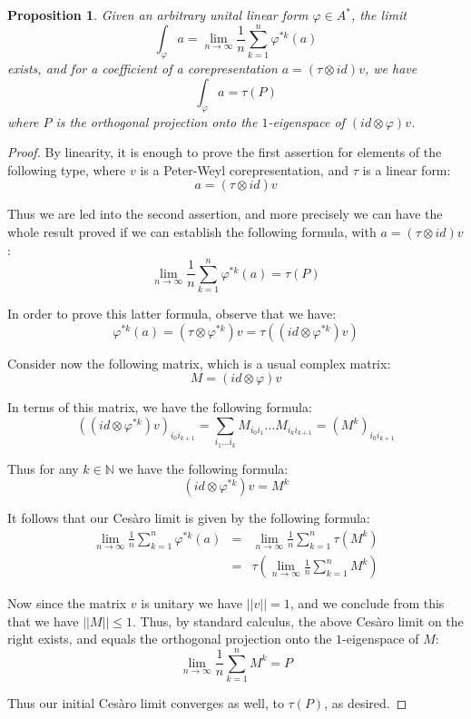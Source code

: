 \documentclass[12pt]{amsbook}
\newtheorem{proposition}[theorem]{Proposition}
\begin{document}

\begin{proposition}
Given an arbitrary unital linear form $\varphi\in A^*$, the limit
$$\int_\varphi a=\lim_{n\to\infty}\frac{1}{n}\sum_{k=1}^n\varphi^{*k}(a)$$
exists, and for a coefficient of a corepresentation $a=(\tau\otimes id)v$, we have
$$\int_\varphi a=\tau(P)$$
where $P$ is the orthogonal projection onto the $1$-eigenspace of $(id\otimes\varphi)v$.
\end{proposition}

\begin{proof}
By linearity, it is enough to prove the first assertion for elements of the following type, where $v$ is a Peter-Weyl corepresentation, and $\tau$ is a linear form:
$$a=(\tau\otimes id)v$$

Thus we are led into the second assertion, and more precisely we can have the whole result proved if we can establish the following formula, with $a=(\tau\otimes id)v$:
$$\lim_{n\to\infty}\frac{1}{n}\sum_{k=1}^n\varphi^{*k}(a)=\tau(P)$$

In order to prove this latter formula, observe that we have:
$$\varphi^{*k}(a)
=(\tau\otimes\varphi^{*k})v
=\tau((id\otimes\varphi^{*k})v)$$

Consider now the following matrix, which is a usual complex matrix:
$$M=(id\otimes\varphi)v$$

In terms of this matrix, we have the following formula:
$$((id\otimes\varphi^{*k})v)_{i_0i_{k+1}}
=\sum_{i_1\ldots i_k}M_{i_0i_1}\ldots M_{i_ki_{k+1}}
=(M^k)_{i_0i_{k+1}}$$

Thus for any $k\in\mathbb N$ we have the following formula:
$$(id\otimes\varphi^{*k})v=M^k$$

It follows that our Ces\`aro limit is given by the following formula:
\begin{eqnarray*}
\lim_{n\to\infty}\frac{1}{n}\sum_{k=1}^n\varphi^{*k}(a)
&=&\lim_{n\to\infty}\frac{1}{n}\sum_{k=1}^n\tau(M^k)\\
&=&\tau\left(\lim_{n\to\infty}\frac{1}{n}\sum_{k=1}^nM^k\right)
\end{eqnarray*}

Now since the matrix $v$ is unitary we have $||v||=1$, and we conclude from this that we have $||M||\leq1$. Thus, by standard calculus, the above Ces\`aro limit on the right exists, and equals the orthogonal projection onto the $1$-eigenspace of $M$:
$$\lim_{n\to\infty}\frac{1}{n}\sum_{k=1}^nM^k=P$$

Thus our initial Ces\`aro limit converges as well, to $\tau(P)$, as desired. 
\end{proof}
\end{document}
